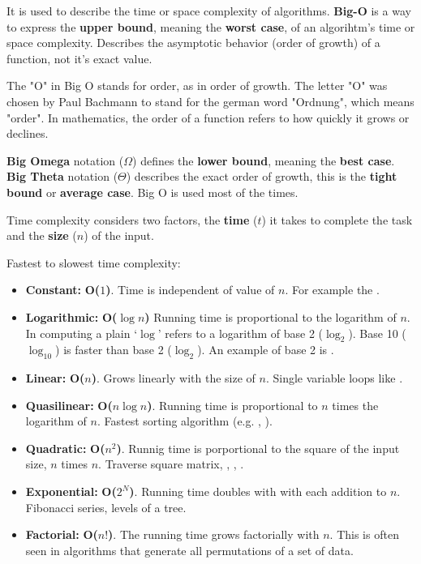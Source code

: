 It is used to describe the time or space complexity of algorithms. \textbf{Big-O} is a way to express the \textbf{upper bound}, meaning the \textbf{worst case}, of an algorihtm's time or space complexity. Describes the asymptotic behavior (order of growth) of a function, not it's exact value.

The "O" in Big O stands for order, as in order of growth. The letter "O" was chosen by Paul Bachmann to stand for the german word "Ordnung", which means "order". In mathematics, the order of a function refers to how quickly it grows or declines.

\textbf{Big Omega} notation ($\Omega$) defines the \textbf{lower bound}, meaning the \textbf{best case}. \textbf{Big Theta} notation ($\Theta$) describes the exact order of growth, this is the \textbf{tight bound} or \textbf{average case}. Big O is used most of the times.

Time complexity considers two factors, the \textbf{time} ($t$) it takes to complete the task and the \textbf{size} ($n$) of the input.

Fastest to slowest time complexity:

\begin{itemize}
  \item \textbf{Constant:} \textbf{O($1$)}. Time is independent of value of $n$. For example the \sumathsrs.
  \item \textbf{Logarithmic:} \textbf{O($\log n$)} Running time is proportional to the logarithm of $n$. In computing a plain `$\log$' refers to a logarithm of base 2 ($\log_2$). Base 10 ($\log_{10}$) is faster than base 2 ($\log_2$). An example of base 2 is \binarysch.
  \item \textbf{Linear:} \textbf{O($n$)}. Grows linearly with the size of $n$. Single variable loops like \linearsch.
  \item \textbf{Quasilinear:} \textbf{O($n \log n$)}. Running time is proportional to $n$ times the logarithm of $n$. Fastest sorting algorithm (e.g. \mergesrt, \heapsrt).
  \item \textbf{Quadratic:} \textbf{O($n^2$)}. Runnig time is porportional to the square of the input size, $n$ times $n$. Traverse square matrix, \bubblesrt, \selectionsrt, \insertionsrt.
  \item \textbf{Exponential:} \textbf{O($2^N$)}. Running time doubles with with each addition to $n$. Fibonacci series, levels of a tree.
  \item \textbf{Factorial:} \textbf{O($n!$)}. The running time grows factorially with $n$. This is often seen in algorithms that generate all permutations of a set of data.
\end{itemize}

